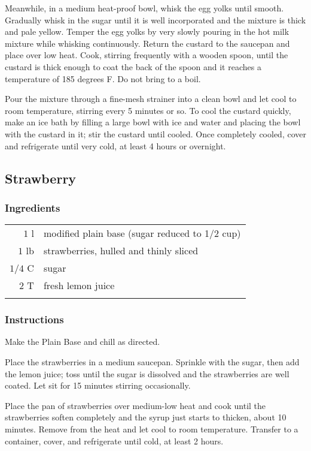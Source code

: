 \documentclass[12pt,landscape,twoside,twocolumn, openright, titlepage, draft]{book}
\begin{document}
Meanwhile, in a medium heat-proof bowl, whisk the egg yolks until smooth. Gradually whisk in the sugar until it is well incorporated and the mixture is thick and pale yellow. Temper the egg yolks by very slowly pouring in the hot milk mixture while whisking continuously. Return the custard to the saucepan and place over low heat. Cook, stirring frequently with a wooden spoon, until the custard is thick enough to coat the back of the spoon and it reaches a temperature of 185 degrees F. Do not bring to a boil.

Pour the mixture through a fine-mesh strainer into a clean bowl and let cool to room temperature, stirring every 5 minutes or so. To cool the custard quickly, make an ice bath by filling a large bowl with ice and water and placing the bowl with the custard in it; stir the custard until cooled. Once completely cooled, cover and refrigerate until very cold, at least 4 hours or overnight.

\subsection{Strawberry}
\subsubsection{Ingredients}
\begin{tabular}{r p{1.5in}}
$1$   l  & modified plain base (sugar reduced to 1/2 cup) \\
$1$   lb & strawberries, hulled and thinly sliced \\ 
$1/4$ C  & sugar    \\
$2$   T  & fresh lemon juice  \\ \\
\end{tabular}
\subsubsection{Instructions}
Make the Plain Base and chill as directed.

Place the strawberries in a medium saucepan. Sprinkle with the sugar, then add the lemon juice; toss until the sugar is dissolved and the strawberries are well coated. Let sit for 15 minutes stirring occasionally.

Place the pan of strawberries over medium-low heat and cook until the strawberries soften completely and the syrup just starts to thicken, about 10 minutes. Remove from the heat and let cool to room temperature. Transfer to a container, cover, and refrigerate until cold, at least 2 hours.
\end{document}
